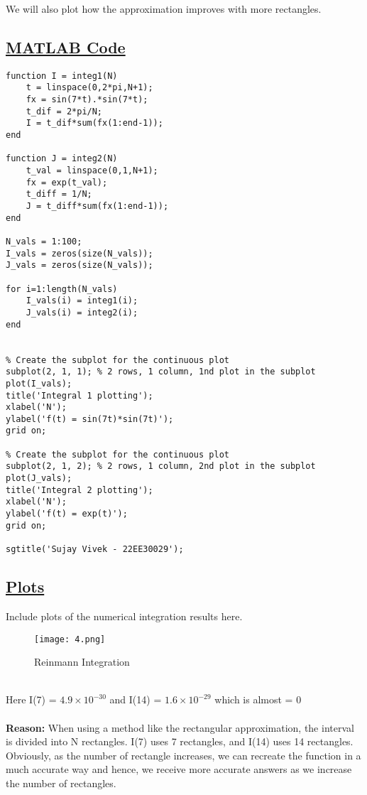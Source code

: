 \documentclass[a4paper,12pt,fleqn]{article}
\begin{document}
We will also plot how the approximation improves with more rectangles.



\subsection*{\underline{MATLAB Code}}
\begin{lstlisting}
function I = integ1(N)
    t = linspace(0,2*pi,N+1);
    fx = sin(7*t).*sin(7*t);
    t_dif = 2*pi/N;
    I = t_dif*sum(fx(1:end-1));
end

function J = integ2(N)
    t_val = linspace(0,1,N+1);
    fx = exp(t_val);
    t_diff = 1/N;
    J = t_diff*sum(fx(1:end-1));
end

N_vals = 1:100;
I_vals = zeros(size(N_vals));
J_vals = zeros(size(N_vals));

for i=1:length(N_vals)
    I_vals(i) = integ1(i);
    J_vals(i) = integ2(i);
end


% Create the subplot for the continuous plot
subplot(2, 1, 1); % 2 rows, 1 column, 1nd plot in the subplot
plot(I_vals);
title('Integral 1 plotting');
xlabel('N');
ylabel('f(t) = sin(7t)*sin(7t)');
grid on;

% Create the subplot for the continuous plot
subplot(2, 1, 2); % 2 rows, 1 column, 2nd plot in the subplot
plot(J_vals);
title('Integral 2 plotting');
xlabel('N');
ylabel('f(t) = exp(t)');
grid on;

sgtitle('Sujay Vivek - 22EE30029');
\end{lstlisting}

\FloatBarrier  %
\newpage  %

\subsection*{\underline{Plots}}
Include plots of the numerical integration results here.
\begin{figure}[h]
        \centering
        \texttt{[image: 4.png]}
        \caption{Reinmann Integration}
        \label{fig:enter-label}
\end{figure}
\\
Here  I(7) = $4.9 \times 10^{-30}$  and  I(14) = $1.6 \times 10^{-29}$ which is almost = $0$
\\ \\
\textbf{Reason:} When using a method like the rectangular approximation, the interval is divided into N rectangles. I(7) uses 7 rectangles, and I(14) uses 14 rectangles. Obviously, as the number of rectangle increases, we can recreate the function in a much accurate way and hence, we receive more accurate answers as we increase the number of rectangles.
\end{document}
